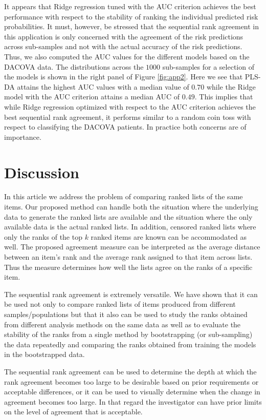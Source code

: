 \documentclass[12pt,a4paper]{article}
\theoremstyle{plain}
\begin{document}
It appears that Ridge regression tuned with the AUC criterion achieves
the best performance with respect to the stability of ranking the
individual predicted risk probabilities. It must, however, be stressed
that the sequential rank agreement in this application is only
concerned with the agreement of the risk predictions across
sub-samples and not with the actual accuracy of the risk
predictions. Thus, we also computed the AUC values for the different models
based on the DACOVA data. The distributions across the $1000$
sub-samples for a selection of the models is shown in the right panel
of Figure \ref{fig:app2}.  Here we see that PLS-DA attains the highest
AUC values with a median value of $0.70$ while the Ridge model with
the AUC criterion attains a median AUC of $0.49$. This implies that
while Ridge regression optimized with respect to the AUC criterion
achieves the best sequential rank agreement, it performs similar to a
random coin toss with respect to classifying the DACOVA patients.
In practice both concerns are of importance.



\section{Discussion}
In this article we address the problem of comparing ranked lists of
the same items. Our proposed method can handle both the situation
where the underlying data to generate the ranked lists are available
and the situation where the only available data is the actual ranked
lists. In addition, censored ranked lists where only the ranks of the
top $k$ ranked items are known can be accommodated as well. The
proposed agreement measure can be interpreted as the average distance
between an item's rank and the average rank assigned to that item
across lists. Thus the measure determines how well the lists agree on
the ranks of a specific item.

The sequential rank agreement is extremely versatile. We have shown
that it can be used not only to compare ranked lists of items produced
from different samples/populations but that it also can be used to
study the ranks obtained from different analysis methods on the same
data as well as to evaluate the stability of the ranks from a single
method by bootstrapping (or sub-sampling) the data repeatedly and
comparing the ranks obtained from training the models in the
bootstrapped data.

The sequential rank agreement can be used to determine the depth at
which the rank agreement becomes too large to be desirable based on
prior requirements or acceptable differences, or it can be used to
visually determine when the change in agreement becomes too large.  In
that regard the investigator can have prior limits on the level of
agreement that is acceptable.
\end{document}
